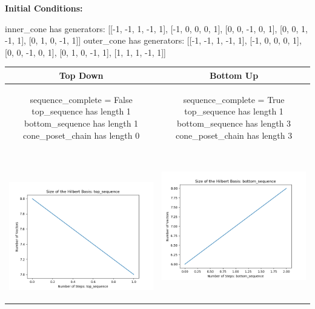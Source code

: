 \documentclass[10pt]{article}
\begin{document}
\textbf{Initial Conditions:}
\begin{SAGE}
inner_cone has generators: 
[[-1, -1, 1, -1, 1], [-1, 0, 0, 0, 1], [0, 0, -1, 0, 1], [0, 0, 1, -1, 1], [0, 1, 0, -1, 1]]
outer_cone has generators: 
[[-1, -1, 1, -1, 1], [-1, 0, 0, 0, 1], [0, 0, -1, 0, 1], [0, 1, 0, -1, 1], [1, 1, 1, -1, 1]]

\end{SAGE}
\begin{tabular}{c|c}
\textbf{Top Down} & \textbf{Bottom Up} \\ \hline  
\begin{SAGE}
	sequence_complete = False
	top_sequence has length 1
	bottom_sequence has length 1
	cone_poset_chain has length 0
\end{SAGE} 
&
\begin{SAGE}
	sequence_complete = True
	top_sequence has length 1
	bottom_sequence has length 3
	cone_poset_chain has length 3
\end{SAGE} 
\\ \hline
\
\begin{minipage}{.45\textwidth}
\includegraphics[width=\textwidth]{"DATA/5d/5 generators 1 bound A/top_sequence SIZE"}
\end{minipage} &
\begin{minipage}{.45\textwidth}
\includegraphics[width=\textwidth]{"DATA/5d/5 generators 1 bound A bottomup/bottom_sequence SIZE"}

\end{minipage}
\end{tabular}
\end{document}
